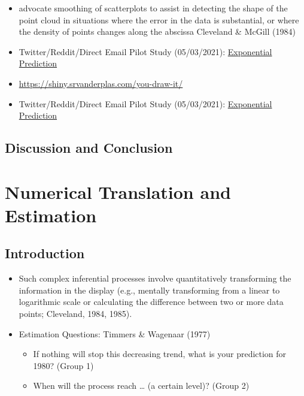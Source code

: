 \documentclass[print]{nuthesis}
\providecommand{\tightlist}{%
  \setlength{\itemsep}{0pt}\setlength{\parskip}{0pt}}
\begin{document}
\begin{itemize}
\tightlist
\item
  advocate smoothing of scatterplots to assist in detecting the shape of the point cloud in situations where the error in the data is substantial, or where the density of points changes along the abscissa Cleveland \& McGill (1984)
\item
  Twitter/Reddit/Direct Email Pilot Study (05/03/2021): \href{https://srvanderplas.github.io/Perception-of-Log-Scales/you-draw-it-development/you-draw-it-pilot-app/analyses/you-draw-it-exponential-prediction-pilot.html}{Exponential Prediction}
\item
  \url{https://shiny.srvanderplas.com/you-draw-it/}
\item
  Twitter/Reddit/Direct Email Pilot Study (05/03/2021): \href{https://srvanderplas.github.io/Perception-of-Log-Scales/you-draw-it-development/you-draw-it-pilot-app/analyses/you-draw-it-exponential-prediction-pilot.html}{Exponential Prediction}
\end{itemize}

\hypertarget{discussion-and-conclusion-1}{%
\section{Discussion and Conclusion}\label{discussion-and-conclusion-1}}

\hypertarget{estimation}{%
\chapter{Numerical Translation and Estimation}\label{estimation}}

\hypertarget{introduction-2}{%
\section{Introduction}\label{introduction-2}}

\begin{itemize}
\tightlist
\item
  Such complex inferential processes involve quantitatively transforming the information in the display (e.g., mentally transforming from a linear to logarithmic scale or calculating the difference between two or more data points; Cleveland, 1984, 1985).
\item
  Estimation Questions: Timmers \& Wagenaar (1977)

  \begin{itemize}
  \tightlist
  \item
    If nothing will stop this decreasing trend, what is your prediction for 1980? (Group 1)
  \item
    When will the process reach \ldots{} (a certain level)? (Group 2)
  \end{itemize}
\end{itemize}
\end{document}
